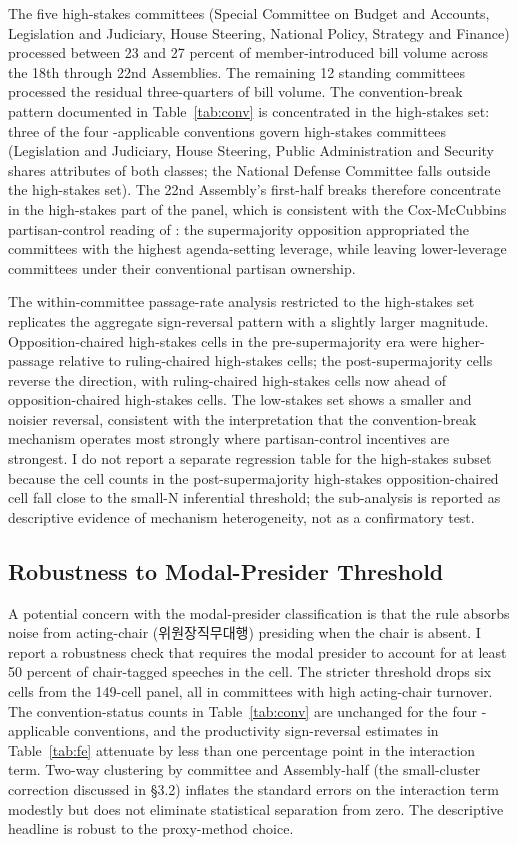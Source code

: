 \documentclass[11pt]{article}
\begin{document}
The five high-stakes committees (Special Committee on Budget and Accounts, Legislation and Judiciary, House Steering, National Policy, Strategy and Finance) processed between 23 and 27 percent of member-introduced bill volume across the 18th through 22nd Assemblies. The remaining 12 standing committees processed the residual three-quarters of bill volume. The convention-break pattern documented in Table~\ref{tab:conv} is concentrated in the high-stakes set: three of the four \citet{jung2018}-applicable conventions govern high-stakes committees (Legislation and Judiciary, House Steering, Public Administration and Security shares attributes of both classes; the National Defense Committee falls outside the high-stakes set). The 22nd Assembly's first-half breaks therefore concentrate in the high-stakes part of the panel, which is consistent with the Cox-McCubbins partisan-control reading of \citet[ch.~3]{coxmccubbins2005}: the supermajority opposition appropriated the committees with the highest agenda-setting leverage, while leaving lower-leverage committees under their conventional partisan ownership.

The within-committee passage-rate analysis restricted to the high-stakes set replicates the aggregate sign-reversal pattern with a slightly larger magnitude. Opposition-chaired high-stakes cells in the pre-supermajority era were higher-passage relative to ruling-chaired high-stakes cells; the post-supermajority cells reverse the direction, with ruling-chaired high-stakes cells now ahead of opposition-chaired high-stakes cells. The low-stakes set shows a smaller and noisier reversal, consistent with the interpretation that the convention-break mechanism operates most strongly where partisan-control incentives are strongest. I do not report a separate regression table for the high-stakes subset because the cell counts in the post-supermajority high-stakes opposition-chaired cell fall close to the small-N inferential threshold; the sub-analysis is reported as descriptive evidence of mechanism heterogeneity, not as a confirmatory test.

\subsection{Robustness to Modal-Presider Threshold}

A potential concern with the modal-presider classification is that the rule absorbs noise from acting-chair (위원장직무대행) presiding when the chair is absent. I report a robustness check that requires the modal presider to account for at least 50 percent of chair-tagged speeches in the cell. The stricter threshold drops six cells from the 149-cell panel, all in committees with high acting-chair turnover. The convention-status counts in Table~\ref{tab:conv} are unchanged for the four \citet{jung2018}-applicable conventions, and the productivity sign-reversal estimates in Table~\ref{tab:fe} attenuate by less than one percentage point in the interaction term. Two-way clustering by committee and Assembly-half (the small-cluster correction discussed in §3.2) inflates the standard errors on the interaction term modestly but does not eliminate statistical separation from zero. The descriptive headline is robust to the proxy-method choice.
\end{document}
